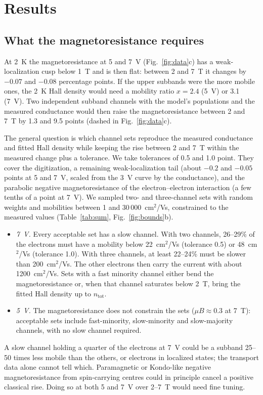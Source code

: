 \documentclass[11pt]{article}
\newcommand{\ntot}{n_\mathrm{tot}}
\begin{document}
\section{Results}
\subsection{What the magnetoresistance requires}\label{sec:mr}
At 2~K the magnetoresistance at 5 and 7~V (Fig.~\ref{fig:data}c) has a weak-localization cusp below 1~T and is then flat: between 2 and 7~T it changes by $-0.07$ and $-0.08$ percentage points. If the upper subbands were the more mobile ones, the 2~K Hall density would need a mobility ratio $x=2.4$ (5~V) or 3.1 (7~V). Two independent subband channels with the model's populations and the measured conductance would then raise the magnetoresistance between 2 and 7~T by 1.3 and 9.5 points (dashed in Fig.~\ref{fig:data}c).

The general question is which channel sets reproduce the measured conductance and fitted Hall density while keeping the rise between 2 and 7~T within the measured change plus a tolerance. We take tolerances of 0.5 and 1.0 point. They cover the digitization, a remaining weak-localization tail (about $-0.2$ and $-0.05$ points at 5 and 7~V, scaled from the 3~V curve by the conductance), and the parabolic negative magnetoresistance of the electron--electron interaction (a few tenths of a point at 7~V). We sampled two- and three-channel sets with random weights and mobilities between 1 and 30\,000~cm$^2$/Vs, constrained to the measured values (Table~\ref{tab:sum}, Fig.~\ref{fig:bounds}b).
\begin{itemize}
\item \emph{7~V.} Every acceptable set has a slow channel. With two channels, 26--29\% of the electrons must have a mobility below 22~cm$^2$/Vs (tolerance 0.5) or 48~cm$^2$/Vs (tolerance 1.0). With three channels, at least 22--24\% must be slower than 200~cm$^2$/Vs. The other electrons then carry the current with about 1200~cm$^2$/Vs. Sets with a fast minority channel either bend the magnetoresistance or, when that channel saturates below 2~T, bring the fitted Hall density up to $\ntot$.
\item \emph{5~V.} The magnetoresistance does not constrain the sets ($\mu B\approx0.3$ at 7~T): acceptable sets include fast-minority, slow-minority and slow-majority channels, with no slow channel required.
\end{itemize}
A slow channel holding a quarter of the electrons at 7~V could be a subband 25--50 times less mobile than the others, or electrons in localized states; the transport data alone cannot tell which. Paramagnetic or Kondo-like negative magnetoresistance from spin-carrying centres could in principle cancel a positive classical rise. Doing so at both 5 and 7~V over 2--7~T would need fine tuning.
\end{document}

